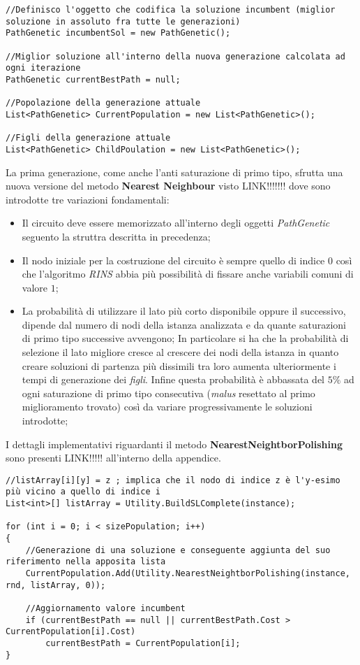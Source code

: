 \documentclass[11pt]{article}
\begin{document}
\begin{lstlisting}
//Definisco l'oggetto che codifica la soluzione incumbent (miglior soluzione in assoluto fra tutte le generazioni)
PathGenetic incumbentSol = new PathGenetic();

//Miglior soluzione all'interno della nuova generazione calcolata ad ogni iterazione
PathGenetic currentBestPath = null;

//Popolazione della generazione attuale
List<PathGenetic> CurrentPopulation = new List<PathGenetic>();

//Figli della generazione attuale
List<PathGenetic> ChildPoulation = new List<PathGenetic>();
\end{lstlisting}

La prima generazione, come anche l'anti saturazione di primo tipo, sfrutta una nuova versione del metodo \textbf{Nearest Neighbour} visto LINK!!!!!!! dove sono introdotte tre variazioni fondamentali:

\begin{itemize}
    \item Il circuito deve essere memorizzato all'interno degli oggetti \textit{PathGenetic} seguento la struttra descritta in precedenza;
    \item Il nodo iniziale per la costruzione del circuito è sempre quello di indice $0$ così che l'algoritmo \textit{RINS} abbia più possibilità di fissare anche variabili comuni di valore $1$;
    \item La probabilità di utilizzare il lato più corto disponibile oppure il successivo, dipende dal numero di nodi della istanza analizzata e da quante saturazioni di primo tipo successive avvengono;
    In particolare si ha che la probabilità di selezione il lato migliore cresce al crescere dei nodi della istanza in quanto creare soluzioni di partenza più dissimili tra loro aumenta ulteriormente i tempi di generazione dei \textit{figli}. Infine questa probabilità è abbassata del $5\%$ ad ogni saturazione di primo tipo consecutiva (\textit{malus} resettato al primo miglioramento trovato) così da variare progressivamente le soluzioni introdotte;
\end{itemize}

I dettagli implementativi riguardanti il metodo \textbf{NearestNeightborPolishing} sono presenti LINK!!!!! all'interno della appendice.

\begin{lstlisting}
//listArray[i][y] = z ; implica che il nodo di indice z è l'y-esimo più vicino a quello di indice i
List<int>[] listArray = Utility.BuildSLComplete(instance);

for (int i = 0; i < sizePopulation; i++)
{
    //Generazione di una soluzione e conseguente aggiunta del suo riferimento nella apposita lista
    CurrentPopulation.Add(Utility.NearestNeightborPolishing(instance, rnd, listArray, 0));
    
    //Aggiornamento valore incumbent
    if (currentBestPath == null || currentBestPath.Cost > CurrentPopulation[i].Cost)
        currentBestPath = CurrentPopulation[i];
}
\end{lstlisting}
\end{document}
